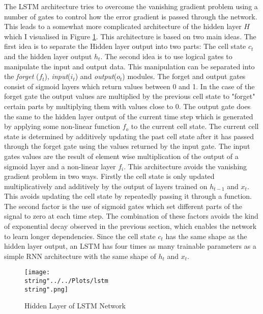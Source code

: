 The LSTM architecture tries to overcome the vanishing gradient problem using a number of gates to control how the error gradient is passed through the network. This leads to a somewhat more complicated architecture of the hidden layer $H$ which I visualised in Figure \ref{fig:lstm}. This architecture is based on two main ideas. The first idea is to separate the Hidden layer output into two parts: The cell state $c_t$ and the hidden layer output $h_t$. The second idea is to use logical gates to manipulate the input and output data. This manipulation can be separated into the \textit{forget} ($f_t$), \textit{input}($i_t$) and \textit{output}($o_t$) modules. The forget and output gates consist of sigmoid layers which return values between 0 and 1. In the case of the forget gate the output values are multiplied by the previous cell state to "forget" certain parts by multiplying them with values close to 0.  The output gate does the same to the hidden layer output of the current time step which is generated by applying some non-linear function $f_o$ to the current cell state. The current cell state is determined by additively updating the past cell state after it has passed through the forget gate using the values returned by the input gate. The input gates values are the result of element wise multiplication of the output of a sigmoid layer and a non-linear layer $f_i$. 
This architecture avoids the vanishing gradient problem in two ways. Firstly the cell state is only updated multiplicatively and additively by the output of layers trained on $h_{t-1}$ and $x_t$. This avoids updating the cell state by repeatedly passing it through a function. The second factor is the use of sigmoid gates which set different parts of the signal to zero at each time step. The combination of these factors avoids the kind of exponential decay observed in the previous section, which enables the network to learn longer dependencies. Since the cell state $c_t$ has the same shape as the hidden layer output, an LSTM has four times as many trainable parameters as a simple RNN architecture with the same shape of $h_t$ and $x_t$.
\begin{figure}
  \centering
\texttt{[image: \\string"../../Plots/lstm\\string".png]}
  \caption{Hidden Layer of LSTM Network}\label{fig:lstm}
\end{figure}
